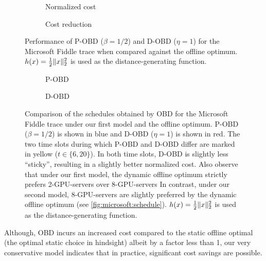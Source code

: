 \begin{figure}
    \begin{subfigure}[b]{.5\linewidth}
    \resizebox{\textwidth}{!}{}
    \caption{Normalized cost}\label{fig:case_studies:md:obd:normalized_cost}
    \end{subfigure}
    \begin{subfigure}[b]{.5\linewidth}
    \resizebox{\textwidth}{!}{}
    \caption{Cost reduction}\label{fig:case_studies:md:obd:cost_reduction}
    \end{subfigure}
    \caption{Performance of P-OBD  ($\beta = 1/2$) and D-OBD  ($\eta = 1$) for the Microsoft Fiddle trace when compared against the offline optimum. $h(x) = \frac{1}{2} \lVert x\rVert_2^2$ is used as the distance-generating function.}
\end{figure}

\begin{figure}
    \begin{subfigure}[b]{.5175\linewidth}
    \resizebox{\textwidth}{!}{}
    \caption{P-OBD}
    \end{subfigure}
    \begin{subfigure}[b]{.4825\linewidth}
    \resizebox{\textwidth}{!}{}
    \caption{D-OBD}
    \end{subfigure}
    \caption{Comparison of the schedules obtained by OBD for the Microsoft Fiddle trace under our first model and the offline optimum. P-OBD ($\beta = 1/2$) is shown in blue and D-OBD ($\eta = 1$) is shown in red. The two time slots during which P-OBD and D-OBD differ are marked in yellow ($t \in \{6, 20\}$). In both time slots, D-OBD is slightly less ``sticky'', resulting in a slightly better normalized cost. Also observe that under our first model, the dynamic offline optimum strictly prefers 2-GPU-servers over 8-GPU-servers In contrast, under our second model, 8-GPU-servers are slightly preferred by the dynamic offline optimum (see \cref{fig:microsoft:schedule}). $h(x) = \frac{1}{2} \lVert x\rVert_2^2$ is used as the distance-generating function.}\label{fig:case_studies:md:obd:schedule}
\end{figure}

Although, OBD incurs an increased cost compared to the static offline optimal (the optimal static choice in hindsight) albeit by a factor less than 1, our very conservative model indicates that in practice, significant cost savings are possible.

